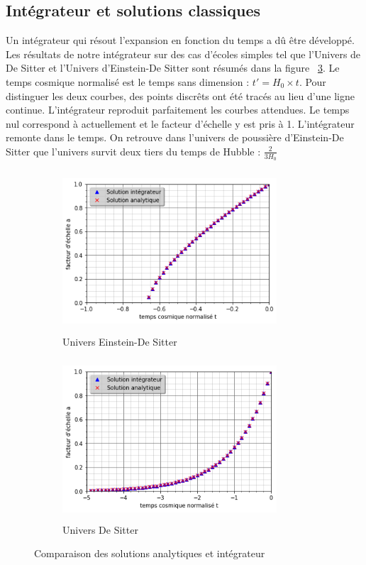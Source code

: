 \documentclass[10pt, a4paper]{report}
\numberwithin{equation}{subsection}
\begin{document}
\subsection{Intégrateur et solutions classiques}
Un intégrateur qui résout l'expansion en fonction du temps a dû être développé. Les résultats de notre intégrateur sur des cas d'écoles simples tel que l'Univers de De Sitter et l'Univers d'Einstein-De Sitter sont résumés dans la figure ~\ref{fig:UISC}. Le temps cosmique normalisé est le temps sans dimension : $t' = H_0 \times t$. Pour distinguer les deux courbes, des points discrêts ont été tracés au lieu d'une ligne continue. L'intégrateur reproduit parfaitement les courbes attendues. Le temps nul correspond à actuellement et le facteur d'échelle y est pris à 1. L'intégrateur remonte dans le temps. On retrouve dans l'univers de poussière d'Einstein-De Sitter que l'univers survit deux tiers du temps de Hubble : $\frac{2}{3H_0}$ 

\begin{figure}[]

\begin{subfigure}{0.5\textwidth}
\includegraphics[width=8.0cm,height=6cm]{EDSf.png}
\caption{Univers Einstein-De Sitter}
\label{fig:UEDS}
\end{subfigure}
\begin{subfigure}{0.5\textwidth}
\includegraphics[width=8.0cm,height=6cm]{DSf.png}
\caption{Univers De Sitter}
\label{fig:UDS}
\end{subfigure}

\caption{Comparaison des solutions analytiques et intégrateur}
\label{fig:UISC}
\end{figure}
\end{document}
